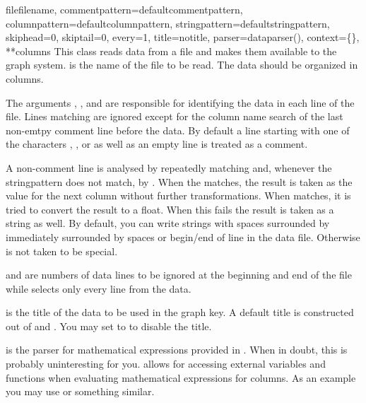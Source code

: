 \begin{classdesc}{file}{filename, %
                        commentpattern=defaultcommentpattern,
                        columnpattern=defaultcolumnpattern,
                        stringpattern=defaultstringpattern,
                        skiphead=0, skiptail=0, every=1, title=notitle,
                        parser=dataparser(), context=\{\}, **columns}
  This class reads data from a file and makes them available to the
  graph system.  is the name of the file to be read.
  The data should be organized in columns.

  The arguments , , and
   are responsible for identifying the data in each
  line of the file. Lines matching  are ignored
  except for the column name search of the last non-emtpy comment line
  before the data. By default a line starting with one of the
  characters \character{\#}, \character{\%}, or \character{!} as well
  as an empty line is treated as a comment.

  A non-comment line is analysed by repeatedly matching
   and, whenever the stringpattern does not match,
  by . When the  matches, the
  result is taken as the value for the next column without further
  transformations. When  matches, it is tried to
  convert the result to a float. When this fails the result is taken
  as a string as well. By default, you can write strings with spaces
  surrounded by \character{\textquotedbl} immediately surrounded by
  spaces or begin/end of line in the data file. Otherwise
  \character{\textquotedbl} is not taken to be special.

   and  are numbers of data lines to be
  ignored at the beginning and end of the file while 
  selects only every  line from the data.

   is the title of the data to be used in the graph key. A
  default title is constructed out of  and
  . You may set  to  to disable
  the title.

   is the parser for mathematical expressions provided in
  . When in doubt, this is probably uninteresting for
  you.  allows for accessing external variables and
  functions when evaluating mathematical expressions for columns. As
  an example you may use  or something similar.


\end{classdesc}
